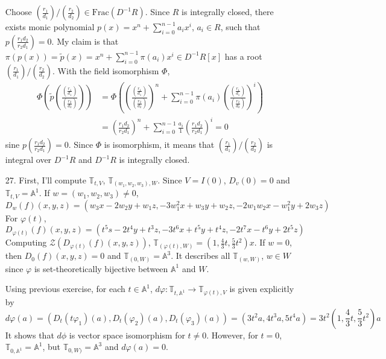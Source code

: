 \documentclass[12pt]{article}
\newcommand{\Z}{\mathcal{Z}}
\begin{document}
\begin{enumerate}
Choose $\left(\frac{r_1}{d_1}\right)/\left(\frac{r_2}{d_2}\right)\in \text{Frac}(D^{-1}R)$. Since $R$ is integrally closed, there exists monic polynomial $p(x)=x^n+\sum\limits_{i=0}^{n-1}a_i x^i$, $a_i\in R$, such that $p\left(\frac{r_1d_2}{r_2d_1}\right)=0$. My claim is that $\pi(p(x))=\tilde{p}(x)=x^n+\sum\limits_{i=0}^{n-1}\pi(a_i) x^i\in D^{-1}R[x]$ has a root $\left(\frac{r_1}{d_1}\right)/\left(\frac{r_2}{d_2}\right)$. With the field isomorphism $\Phi$,
\begin{equation*}
\begin{split}
\Phi\left(\tilde{p}\left(\frac{\left(\frac{r_1}{d_1}\right)}{\left(\frac{r_2}{d_2}\right)}\right)\right)&=\Phi\left(\left(\frac{\left(\frac{r_1}{d_1}\right)}{\left(\frac{r_2}{d_2}\right)}\right)^n+\sum\limits_{i=0}^{n-1} \pi(a_i)\left(\frac{\left(\frac{r_1}{d_1}\right)}{\left(\frac{r_2}{d_2}\right)}\right)^{i}\right) \\
&=\left(\frac{r_1d_2}{r_2d_1}\right)^n+\sum\limits_{i=0}^{n-1}\frac{a_i}{1}\left(\frac{r_1d_2}{r_2d_1}\right)^i=0
\end{split}
\end{equation*}
sine $p\left(\frac{r_1d_2}{r_2d_1}\right)=0$. Since $\Phi$ is isomorphism, it means that $\left(\frac{r_1}{d_1}\right)/\left(\frac{r_2}{d_2}\right)$ is integral over $D^{-1}R$ and $D^{-1}R$ is integrally closed.
\newpage
\item[27.]
First, I'll compute $\mathbb{T}_{t, V}$, $\mathbb{T}_{(w_1, w_2, w_3), W}$. Since $V=I(0)$, $D_v(0)=0$ and $\mathbb{T}_{t, V}=\mathbb{A}^1$. If $w=(w_1, w_2, w_3)\neq 0$,
\begin{equation*}
D_w(f)(x,y,z)=(w_3 x-2w_2 y+w_1 z,-3w_1^2 x+w_3 y+w_2 z, -2w_1 w_2 x-w_1^2 y+2w_3 z)
\end{equation*}
For $\varphi(t)$,
\begin{equation*}
D_{\varphi(t)}(f)(x,y,z)=(t^5s-2t^4y+t^3z, -3t^6x+t^5y+t^4z, -2t^7x-t^6y+2t^5z)
\end{equation*}
Computing $\Z\left(D_{\varphi(t)}(f)(x,y,z)\right)$, $\mathbb{T}_{(\varphi(t), W)}= \left(1, \frac{4}{3}t, \frac{5}{3}t^2\right)x$.
If $w=0$, then $D_0(f)(x,y,z)=0$ and $\mathbb{T}_{(0, W)}=\mathbb{A}^3$. It describes all $\mathbb{T}_{(w, W)}$, $w\in W$ since $\varphi$ is set-theoretically bijective between $\mathbb{A}^1$ and $W$.

Using previous exercise, for each $t\in \mathbb{A}^1$, $d\varphi:\mathbb{T}_{t, \mathbb{A}^1}\rightarrow \mathbb{T}_{\varphi(t),V}$ is given explicitly by
\begin{equation*}
d\varphi(a)=(D_t(t\varphi_1)(a), D_t(\varphi_2)(a), D_t(\varphi_3)(a))=(3t^2a, 4t^3a, 5t^4a)=3t^2\left(1, \frac{4}{3}t, \frac{5}{3}t^2\right)a
\end{equation*}
It shows that $d\phi$ is vector space isomorphism for $t\neq 0$. However, for $t=0$, $\mathbb{T}_{0, \mathbb{A}^1}=\mathbb{A}^1$, but $\mathbb{T}_{0, W)}=\mathbb{A}^3$ and $d\varphi(a)=0$.


\end{enumerate}
\end{document}
